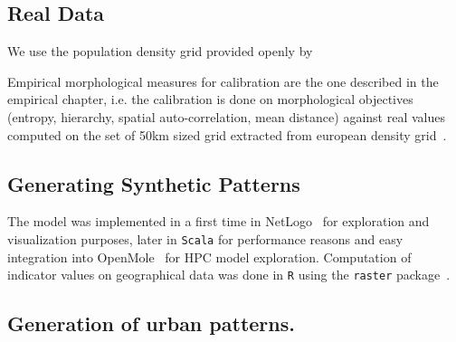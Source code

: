 \documentclass[10pt,letterpaper]{article}
\begin{document}
\subsection{Real Data}

We use the population density grid provided openly by 




Empirical morphological measures for calibration are the one described in the empirical chapter, i.e. the calibration is done on morphological objectives (entropy, hierarchy, spatial auto-correlation, mean distance) against real values computed on the set of 50km sized grid extracted from european density grid~\cite{eurostat}.







\subsection{Generating Synthetic Patterns}






The model was implemented in a first time in NetLogo~\cite{wilensky1999netlogo} for exploration and visualization purposes, later in \texttt{Scala} for performance reasons and easy integration into OpenMole~\cite{reuillon2013openmole} for HPC model exploration. Computation of indicator values on geographical data was done in \texttt{R} using the \texttt{raster} package~\cite{hijmans2015geographic}.




\subsection*{Generation of urban patterns.}


\end{document}
